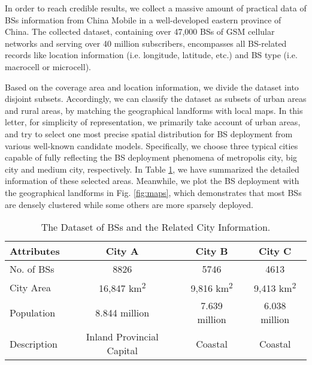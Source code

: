 In order to reach credible results, we collect a massive amount of practical data of BSs information from China Mobile in a well-developed eastern province of China. The collected dataset, containing over 47,000 BSs of GSM cellular networks and serving  over 40 million subscribers, encompasses all BS-related records like location information (i.e. longitude, latitude, etc.) and BS type (i.e. macrocell or microcell).

Based on the coverage area and location information, we divide the dataset into disjoint subsets. Accordingly, we can classify the dataset as subsets of urban areas and rural areas, by matching the geographical landforms with local maps. In this letter, for simplicity of representation, we primarily take account of urban areas, and try to select one most precise spatial distribution for BS deployment from various well-known candidate models. Specifically, we choose three typical cities capable of fully reflecting the BS deployment phenomena of metropolis city, big city and medium city, respectively. In Table \ref{tb:bss}, we have summarized the detailed information of these selected areas. Meanwhile, we plot the BS deployment with the geographical landforms in Fig. \ref{fig:maps}, which demonstrates that most BSs are densely clustered while some others are more sparsely deployed.

\vspace{-10pt}
\begin{table}
\centering
\caption{The Dataset of BSs and the Related City Information.}
\setlength\abovecaptionskip{-5pt}
\setlength\belowcaptionskip{-5pt}
\label{tb:bss}
\begin{tabular}{l|c|c|c}
\toprule
Attributes & City A & City B & City C\\
\midrule
No. of BSs & 8826 & 5746 & 4613\\
\hline
City Area & 16,847 km\textsuperscript{2} & 9,816 km\textsuperscript{2} & 9,413 km\textsuperscript{2}\\
\hline
Population & 8.844 million & 7.639 million & 6.038 million\\
\hline
Description & Inland Provincial Capital & Coastal & Coastal\\
\bottomrule
\end{tabular}
\end{table}

\vspace{-6pt}
